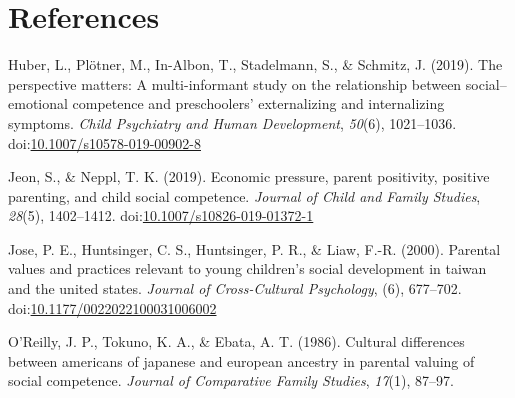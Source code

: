 \documentclass[man]{apa6}
\begin{document}
\newpage

\hypertarget{references}{%
\section{References}\label{references}}

\begingroup
\setlength{\parindent}{-0.5in}
\setlength{\leftskip}{0.5in}

\hypertarget{refs}{}
\leavevmode\hypertarget{ref-Huber2019}{}%
Huber, L., Plötner, M., In-Albon, T., Stadelmann, S., \& Schmitz, J. (2019). The perspective matters: A multi-informant study on the relationship between social--emotional competence and preschoolers' externalizing and internalizing symptoms. \emph{Child Psychiatry and Human Development}, \emph{50}(6), 1021--1036. doi:\href{https://doi.org/10.1007/s10578-019-00902-8}{10.1007/s10578-019-00902-8}

\leavevmode\hypertarget{ref-Jeon_Neppl_2019}{}%
Jeon, S., \& Neppl, T. K. (2019). Economic pressure, parent positivity, positive parenting, and child social competence. \emph{Journal of Child and Family Studies}, \emph{28}(5), 1402--1412. doi:\href{https://doi.org/10.1007/s10826-019-01372-1}{10.1007/s10826-019-01372-1}

\leavevmode\hypertarget{ref-Jose_Huntsinger_Huntsinger_Liaw_2000}{}%
Jose, P. E., Huntsinger, C. S., Huntsinger, P. R., \& Liaw, F.-R. (2000). Parental values and practices relevant to young children's social development in taiwan and the united states. \emph{Journal of Cross-Cultural Psychology}, (6), 677--702. doi:\href{https://doi.org/10.1177/0022022100031006002}{10.1177/0022022100031006002}

\leavevmode\hypertarget{ref-OReilly_Tokuno_Ebata_1986}{}%
O'Reilly, J. P., Tokuno, K. A., \& Ebata, A. T. (1986). Cultural differences between americans of japanese and european ancestry in parental valuing of social competence. \emph{Journal of Comparative Family Studies}, \emph{17}(1), 87--97.

\endgroup
\end{document}

